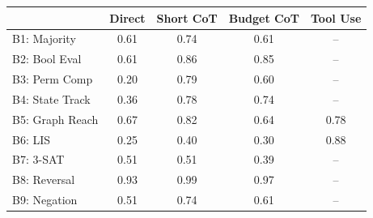 \begin{tabular}{lcccc}
\toprule
 & Direct & Short CoT & Budget CoT & Tool Use \\
\midrule
B1: Majority & 0.61 & 0.74 & 0.61 & -- \\
B2: Bool Eval & 0.61 & 0.86 & 0.85 & -- \\
B3: Perm Comp & 0.20 & 0.79 & 0.60 & -- \\
B4: State Track & 0.36 & 0.78 & 0.74 & -- \\
B5: Graph Reach & 0.67 & 0.82 & 0.64 & 0.78 \\
B6: LIS & 0.25 & 0.40 & 0.30 & 0.88 \\
B7: 3-SAT & 0.51 & 0.51 & 0.39 & -- \\
B8: Reversal & 0.93 & 0.99 & 0.97 & -- \\
B9: Negation & 0.51 & 0.74 & 0.61 & -- \\
\bottomrule
\end{tabular}